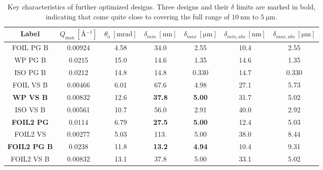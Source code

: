 \begin{table}[h!]
	\centering
	\begin{tabular}{c | c c c c | cc}
		\toprule
		Label & $Q_{\text{max}} ~[\unit{\angstrom^{-1}}]$ & $\theta_a~[\unit{\milli\radian}]$ & $\delta_{min}~[\unit{\nano\meter}]$ & $\delta_{max}~[\unit{\micro\meter}]$ & $\delta_{min,abs}~[\unit{\nano\meter}]$ & $\delta_{max,abs}~[\unit{\micro\meter}]$ \\
		\midrule
		FOIL PG B & \num{0.00924} & \num{4.58} & \num{34.0} & \num{2.55} & \num{10.4} & \num{2.55} \\
		WP PG B & \num{0.0215} & \num{15.0} & \num{14.6} & \num{1.35} & \num{14.6} & \num{1.35} \\
		ISO PG B & \num{0.0212} & \num{14.8} & \num{14.8} & \num{0.330} & \num{14.7} & \num{0.330} \\
		FOIL VS B & \num{0.00466} & \num{6.01} & \num{67.6} & \num{4.98} & \num{27.1} & \num{5.73} \\
		\textbf{WP VS B} & \num{0.00832} & \num{12.6} & \textbf{37.8} & \textbf{5.00} & \num{31.7} & \num{5.02} \\
		ISO VS B & \num{0.00561} & \num{10.7} & \num{56.0} & \num{2.91} & \num{40.0} & \num{2.92} \\
		\midrule
		\textbf{FOIL2 PG} & \num{0.0114} & \num{6.79} & \textbf{27.5} & \textbf{5.00} & \num{12.4} & \num{5.03} \\
		FOIL2 VS & \num{0.00277} & \num{5.03} & \num{113.} & \num{5.00} & \num{38.0} & \num{8.44} \\
		\textbf{FOIL2 PG B} & \num{0.0238} & \num{11.8} & \textbf{13.2} & \textbf{4.94} & \num{10.4} & \num{9.31} \\
		FOIL2 VS B & \num{0.00832} & \num{13.1} & \num{37.8} & \num{5.00} & \num{33.1} & \num{5.02} \\
		\bottomrule
	\end{tabular}
	\caption{Key characteristics of further optimized designs. Three designs and their $\delta$ limits are marked in bold, indicating that come quite close to covering the full range of $\SI{10}{\nano\meter}$ to $\SI{5}{\micro\meter}$.}
	\label{tab:optimized-designs-performance-detector-boost}
\end{table}


